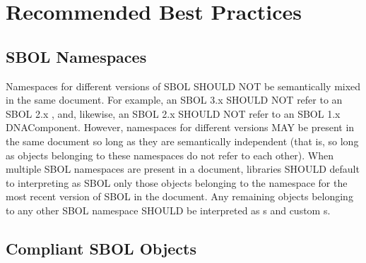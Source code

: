 \section{Recommended Best Practices}
\label{sec:bestpractices}
\subsection{SBOL Namespaces}

Namespaces for different versions of SBOL SHOULD NOT be semantically mixed in the same document. For example, an SBOL 3.x  SHOULD NOT refer to an SBOL 2.x , and, likewise, an SBOL 2.x  SHOULD NOT refer to an SBOL 1.x DNAComponent. However, namespaces for different versions MAY be present in the same document so long as they are semantically independent (that is, so long as objects belonging to these namespaces do not refer to each other). When multiple SBOL namespaces are present in a document, libraries SHOULD default to interpreting as SBOL only those objects belonging to the namespace for the most recent version of SBOL in the document. Any remaining objects belonging to any other SBOL namespace SHOULD be interpreted as s and custom s.

\subsection{Compliant SBOL Objects}
\label{sec:compliant}

